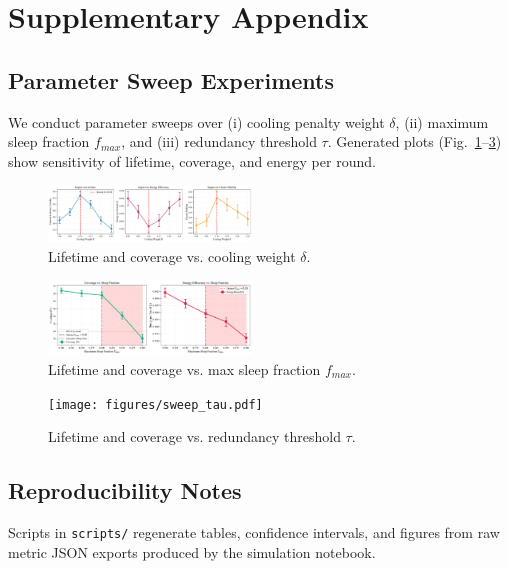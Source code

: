 \section{Supplementary Appendix}
\subsection{Parameter Sweep Experiments}
We conduct parameter sweeps over (i) cooling penalty weight $\delta$, (ii) maximum sleep fraction $f_{max}$, and (iii) redundancy threshold $\tau$. Generated plots (Fig.~\ref{fig:sweep-delta}--\ref{fig:sweep-tau}) show sensitivity of lifetime, coverage, and energy per round.

\begin{figure}[ht]
  \centering
  \includegraphics[width=0.48\textwidth]{figures/sweep_delta.pdf}
  \caption{Lifetime and coverage vs. cooling weight $\delta$.}
  \label{fig:sweep-delta}
\end{figure}
\begin{figure}[ht]
  \centering
  \includegraphics[width=0.48\textwidth]{figures/sweep_fmax.pdf}
  \caption{Lifetime and coverage vs. max sleep fraction $f_{max}$.}
  \label{fig:sweep-fmax}
\end{figure}
\begin{figure}[ht]
  \centering
  \texttt{[image: figures/sweep\_tau.pdf]}
  \caption{Lifetime and coverage vs. redundancy threshold $\tau$.}
  \label{fig:sweep-tau}
\end{figure}

\subsection{Reproducibility Notes}
Scripts in \texttt{scripts/} regenerate tables, confidence intervals, and figures from raw metric JSON exports produced by the simulation notebook.

